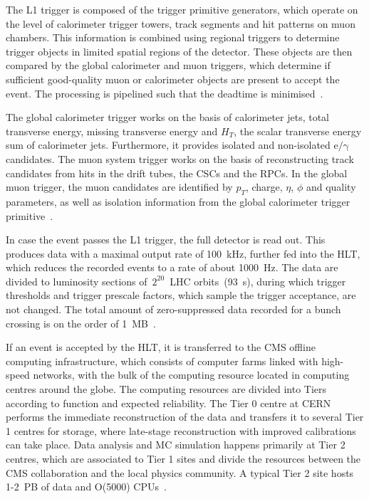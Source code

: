 The L1 trigger is composed of the trigger primitive generators, which operate on the level of calorimeter trigger towers, track segments and hit patterns on muon chambers.  This information is combined using regional triggers to determine trigger objects in limited spatial regions of the detector. These objects are then compared by the global calorimeter and muon triggers, which determine if sufficient good-quality muon or calorimeter objects are present to accept the event. The processing is pipelined such that the deadtime is minimised~\cite{Chatrchyan:2008aa}.

The global calorimeter trigger works on the basis of calorimeter jets, total transverse energy, missing transverse energy and $H_T$, the scalar transverse energy sum of calorimeter jets. Furthermore, it provides isolated and non-isolated $\mathrm{e}/\mathrm{\gamma}$ candidates. The muon system trigger works on the basis of reconstructing track candidates from hits in the drift tubes, the CSCs and the RPCs. In the global muon trigger, the muon candidates are identified by $p_T$, charge, $\eta$, $\phi$ and quality parameters, as well as isolation information from the global calorimeter trigger primitive~\cite{Chatrchyan:2008aa}.

In case the event passes the L1 trigger, the full detector is read out. This produces data with a maximal output rate of 100~kHz, further fed into the HLT, which reduces the recorded events to a rate of about 1000~Hz. The data are divided to luminosity sections of~$2^{20}$~LHC orbits~(93~s), during which trigger thresholds and trigger prescale factors, which sample the trigger acceptance, are not changed. The total amount of zero-suppressed data recorded for a bunch crossing is on the order of 1~MB~\cite{Chatrchyan:2008aa}.

If an event is accepted by the HLT, it is transferred to the CMS offline computing infrastructure, which consists of computer farms linked with high-speed networks, with the bulk of the computing resource located in computing centres around the globe. The computing resources are divided into Tiers according to function and expected reliability. The Tier 0 centre at CERN performs the immediate reconstruction of the data and transfers it to several Tier 1 centres for storage, where late-stage reconstruction with improved calibrations can take place. Data analysis and MC simulation happens primarily at Tier 2 centres, which are associated to Tier 1 sites and divide the resources between the CMS collaboration and the local physics community. A typical Tier 2 site hosts 1-2~PB of data and O(5000) CPUs~\cite{Chatrchyan:2008aa}.

